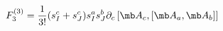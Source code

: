 \begin{equation}
F^{(3)}_{3}=\frac{1}{3!}(s^{c}_{I}+s^{c}_{J})s^{a}_{I}s^{b}_{J}\partial_{c}\left[{\mb A}_{c},[{\mb A}_{a},{\mb A}_{b}]\right]
\end{equation}

